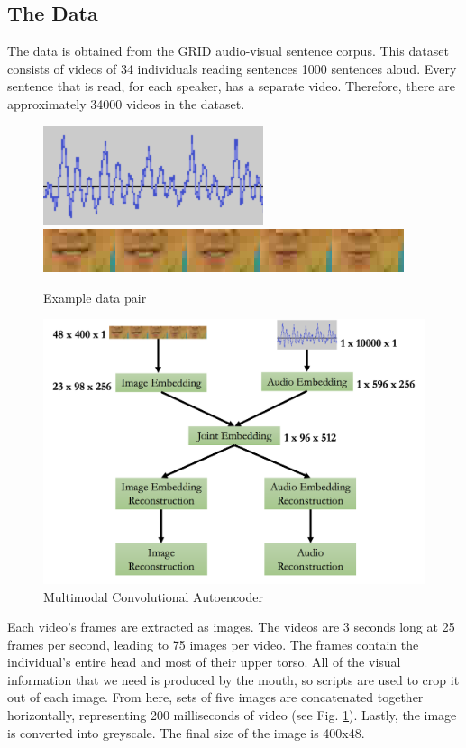 \documentclass[conference]{IEEEtran}
\begin{document}
\subsection{The Data}
The data is obtained from the GRID audio-visual sentence corpus.\cite{Cooke2006} This dataset consists of videos of 34 individuals reading sentences 1000 sentences aloud. Every sentence that is read, for each speaker, has a separate video. Therefore, there are approximately 34000 videos in the dataset.

\begin{figure}[h]
\centering
\includegraphics[scale=0.8]{exampleaudio}
\includegraphics[scale=0.5]{examplevision}
\caption{Example data pair}
\label{fig:datapair}
\end{figure}

\begin{figure}[!t]
\centering
\includegraphics[scale=0.4]{standardmodel}
\caption{Multimodal Convolutional Autoencoder}
\label{fig:standardmodel}
\end{figure}

Each video's frames are extracted as images. The videos are 3 seconds long at 25 frames per second, leading to 75 images per video. The frames contain the individual's entire head and most of their upper torso. All of the visual information that we need is produced by the mouth, so scripts are used to crop it out of each image. From here, sets of five images are concatenated together horizontally, representing 200 milliseconds of video (see Fig. \ref{fig:datapair}). Lastly, the image is converted into greyscale. The final size of the image is 400x48.
\end{document}
